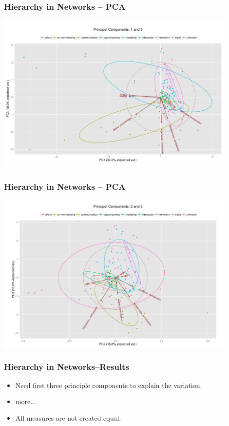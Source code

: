 \documentclass[xcolor={table}]{beamer}
\newenvironment{changemargin}[2]{%
  \begin{list}{}{%
    \setlength{\topsep}{0pt}%
    \setlength{\leftmargin}{#1}%
    \setlength{\rightmargin}{#2}%
    \setlength{\listparindent}{\parindent}%
    \setlength{\itemindent}{\parindent}%
    \setlength{\parsep}{\parskip}%
  }%
  \item[]}{\end{list}}
\begin{document}
\begin{frame}\frametitle{Hierarchy in Networks -- PCA}
	\begin{changemargin}{-2cm}{ -2cm}
		\centering
		\includegraphics[width=12cm, height=8cm]{images/Observed_PCA_Components1_3.pdf}
	\end{changemargin}
\end{frame}

\begin{frame}\frametitle{Hierarchy in Networks -- PCA}
	\begin{changemargin}{-2cm}{ -2cm}
		\centering
		\includegraphics[width=12cm, height=8cm]{images/Observed_PCA_Components2_3.pdf}
	\end{changemargin}
\end{frame}

\begin{frame}\frametitle{Hierarchy in Networks--Results}
	\begin{itemize}
		\item Need first three principle components to explain the variation.
		\item more...
		\item All measures are not created equal.
		
	\end{itemize}
\end{frame}
\end{document}
